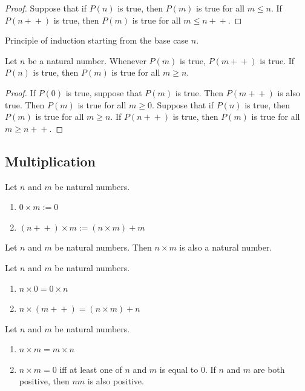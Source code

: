 \documentclass{article}
\newcommand{\pp}{\!+\!+}
\begin{document}
\begin{proof}
    Suppose that if $P(n)$ is true, then $P(m)$ is true for all $m \leq n$.
    If $P(n\pp)$ is true, then $P(m)$ is true for all $m \leq n\pp$.
\end{proof}

\begin{exercise}
    Principle of induction starting from the base case $n$.

    Let $n$ be a natural number. Whenever $P(m)$ is true, $P(m\pp)$ is true.
    If $P(n)$ is true, then $P(m)$ is true for all $m \geq n$.
\end{exercise}

\begin{proof}
    If $P(0)$ is true, suppose that $P(m)$ is true.
    Then $P(m\pp)$ is also true.
    Then $P(m)$ is true for all $m \geq 0$.
    Suppose that if $P(n)$ is true, then $P(m)$ is true for all $m \geq n$.
    If $P(n\pp)$ is true, then $P(m)$ is true for all $m \geq n\pp$.
\end{proof}

\subsection{Multiplication}
\begin{definition}
    Let $n$ and $m$ be natural numbers.
    \begin{enumerate}
        \item $0 \times m := 0$
        \item $(n\pp) \times m := (n \times m) + m$
    \end{enumerate}
\end{definition}

\begin{proposition}
    Let $n$ and $m$ be natural numbers. Then $n \times m$ is also a natural number.
\end{proposition}

\begin{lemma}
    Let $n$ and $m$ be natural numbers.
    \begin{enumerate}
        \item $n \times 0 = 0 \times n$
        \item $n \times (m\pp) = (n \times m) + n$
    \end{enumerate}
\end{lemma}

\begin{lemma}[Commutative]
    \label{lemma:multiplication-commutative}
    Let $n$ and $m$ be natural numbers.
    \begin{enumerate}
        \item $n \times m = m \times n$
        \item $n \times m = 0$ iff at least one of $n$ and $m$ is equal to 0.
              If $n$ and $m$ are both positive, then $nm$ is also positive.
    \end{enumerate}
\end{lemma}
\end{document}
